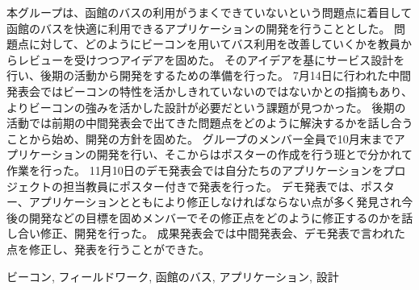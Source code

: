 \documentclass[openany,11pt,papersize]{jsbook}
\begin{document}
  \maketitle

  \frontmatter

  \begin{jabstract}

  


本グループは、函館のバスの利用がうまくできていないという問題点に着目して函館のバスを快適に利用できるアプリケーションの開発を行うこととした。
問題点に対して、どのようにビーコンを用いてバス利用を改善していくかを教員からレビューを受けつつアイデアを固めた。
そのアイデアを基にサービス設計を行い、後期の活動から開発をするための準備を行った。
7月14日に行われた中間発表会ではビーコンの特性を活かしきれていないのではないかとの指摘もあり、よりビーコンの強みを活かした設計が必要だという課題が見つかった。
後期の活動では前期の中間発表会で出てきた問題点をどのように解決するかを話し合うことから始め、開発の方針を固めた。
グループのメンバー全員で10月末までアプリケーションの開発を行い、そこからはポスターの作成を行う班とで分かれて作業を行った。
11月10日のデモ発表会では自分たちのアプリケーションをプロジェクトの担当教員にポスター付きで発表を行った。
デモ発表では、ポスター、アプリケーションとともにより修正しなければならない点が多く発見され今後の開発などの目標を固めメンバーでその修正点をどのように修正するのかを話し合い修正、開発を行った。
成果発表会では中間発表会、デモ発表で言われた点を修正し、発表を行うことができた。

\begin{jkeyword}
ビーコン, フィールドワーク, 函館のバス, アプリケーション, 設計
\end{jkeyword}
\end{jabstract}
\end{document}
